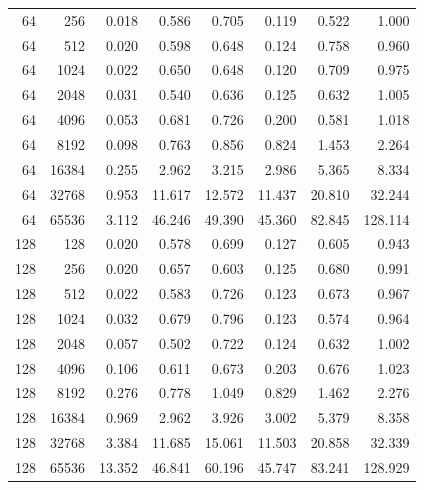 \documentclass[11pt]{article}
\begin{document}
\begin{table}[H]
\begin{tabular}{rrrrrrrr}
64 & 256 & 0.018 & 0.586 & 0.705 & 0.119 & 0.522 & 1.000 \\
64 & 512 & 0.020 & 0.598 & 0.648 & 0.124 & 0.758 & 0.960 \\
64 & 1024 & 0.022 & 0.650 & 0.648 & 0.120 & 0.709 & 0.975 \\
64 & 2048 & 0.031 & 0.540 & 0.636 & 0.125 & 0.632 & 1.005 \\
64 & 4096 & 0.053 & 0.681 & 0.726 & 0.200 & 0.581 & 1.018 \\
64 & 8192 & 0.098 & 0.763 & 0.856 & 0.824 & 1.453 & 2.264 \\
64 & 16384 & 0.255 & 2.962 & 3.215 & 2.986 & 5.365 & 8.334 \\
64 & 32768 & 0.953 & 11.617 & 12.572 & 11.437 & 20.810 & 32.244 \\
64 & 65536 & 3.112 & 46.246 & 49.390 & 45.360 & 82.845 & 128.114 \\
128 & 128 & 0.020 & 0.578 & 0.699 & 0.127 & 0.605 & 0.943 \\
128 & 256 & 0.020 & 0.657 & 0.603 & 0.125 & 0.680 & 0.991 \\
128 & 512 & 0.022 & 0.583 & 0.726 & 0.123 & 0.673 & 0.967 \\
128 & 1024 & 0.032 & 0.679 & 0.796 & 0.123 & 0.574 & 0.964 \\
128 & 2048 & 0.057 & 0.502 & 0.722 & 0.124 & 0.632 & 1.002 \\
128 & 4096 & 0.106 & 0.611 & 0.673 & 0.203 & 0.676 & 1.023 \\
128 & 8192 & 0.276 & 0.778 & 1.049 & 0.829 & 1.462 & 2.276 \\
128 & 16384 & 0.969 & 2.962 & 3.926 & 3.002 & 5.379 & 8.358 \\
128 & 32768 & 3.384 & 11.685 & 15.061 & 11.503 & 20.858 & 32.339 \\
128 & 65536 & 13.352 & 46.841 & 60.196 & 45.747 & 83.241 & 128.929 \\
\bottomrule
\end{tabular}
\end{table}
\end{document}
